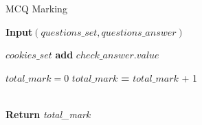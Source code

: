 \begin{algorithm}
\caption{MCQ Marking}\label{alg:MCQ}
\begin{algorithmic}[1]
\State \textbf{Input}$ (questions\_set, questions\_answer)$

        \State $cookies\_set$ \textbf{add} $check\_answer.value$
    \EndIf
\EndFor

\State $ total\_mark = 0 $
        \State $total\_mark$ \textbf{=} $total\_mark$ + 1
    \EndIf
\EndFor

\\\textbf{Return}
\textit{total\_mark}
\end{algorithmic}
\end{algorithm}



